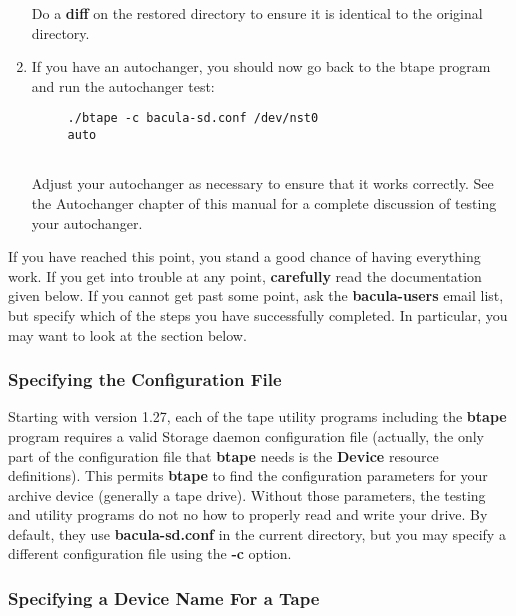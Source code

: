 \begin{enumerate}
\begin{verbatim}
\end{verbatim}
\normalsize

Do a {\bf diff} on the restored directory to ensure it is identical  to the
original directory.  
\item If you have an autochanger, you should now go back to the  btape program
   and run the autochanger test:  

\footnotesize
\begin{verbatim}
     ./btape -c bacula-sd.conf /dev/nst0
     auto
     
\end{verbatim}
\normalsize

Adjust your autochanger as necessary to ensure that it works  correctly. See
the Autochanger chapter of this manual  for a complete discussion of testing
your autochanger.  
\end{enumerate}

If you have reached this point, you stand a good chance of having everything
work. If you get into trouble at any point, {\bf carefully} read the
documentation given below. If you cannot get past some point, ask the {\bf
bacula-users} email list, but specify which of the steps you have successfully
completed. In particular, you may want to look at the 
 section below. 

\subsubsection*{Specifying the Configuration File}

Starting with version 1.27, each of the tape utility programs including the
{\bf btape} program requires a valid Storage daemon configuration file
(actually, the only part of the configuration file that {\bf btape} needs is
the {\bf Device} resource definitions). This permits {\bf btape} to find the
configuration parameters for your archive device (generally a tape drive).
Without those parameters, the testing and utility programs do not no how to
properly read and write your drive. By default, they use {\bf bacula-sd.conf}
in the current directory, but you may specify a different configuration file
using the {\bf -c} option. 

\subsubsection*{Specifying a Device Name For a Tape}


